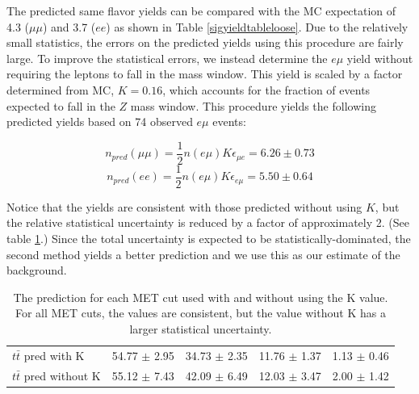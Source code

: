 The predicted same flavor \ttbar yields 
can be compared 
with the MC expectation of 
4.3 %
($\mu\mu$) and 
3.7 %
($ee$) as shown in Table \ref{sigyieldtableloose}.
Due to the relatively small statistics, the errors on the predicted yields 
using this procedure are fairly large.
To improve the statistical errors, we instead determine the $e\mu$ yield
without requiring the leptons to fall in the \Z mass window. 
This yield is scaled by a factor determined from MC, $K= 0.16$, %
which accounts for the fraction of \ttbar events expected to fall in the $Z$ mass
window. This procedure yields the following
predicted yields based on 74 observed $e\mu$ events: %

\begin{equation}
n_{pred}(\mu\mu) = \frac{1}{2}n(e\mu)K\epsilon_{\mu e} = 6.26 \pm 0.73
\end{equation}
\begin{equation}
n_{pred}(ee)     = \frac{1}{2}n(e\mu)K\epsilon_{e\mu} = 5.50 \pm 0.64
\end{equation}

Notice that the yields are consistent with those predicted without using $K$, but the relative statistical uncertainty is reduced by a factor of approximately 2. (See table \ref{tab:ttbpredk}.)
Since the total uncertainty is expected to be statistically-dominated, the second method yields a better prediction and we use this as our estimate
of the \ttbar background. 



\begin{table}[hbt]
  \begin{center}
	\caption{
	  \label{tab:ttbpredk}
	  The \ttbar prediction for each MET cut used with and without using the K value. 
	  For all MET cuts, the values are consistent, but the value without K 
	  has a larger statistical uncertainty.
	}
	\begin{tabular}{lcccc}
	  \hline
	  \resulttitle
\hline
$t\bar{t}$ pred with K    &  54.77  $\pm$  2.95  &  34.73  $\pm$  2.35  &  11.76  $\pm$  1.37  &  1.13  $\pm$  0.46  \\
$t\bar{t}$ pred without K &  55.12  $\pm$  7.43  &  42.09  $\pm$  6.49  &  12.03  $\pm$  3.47  &  2.00  $\pm$  1.42  \\

\hline
	\end{tabular}
  \end{center}
\end{table}



